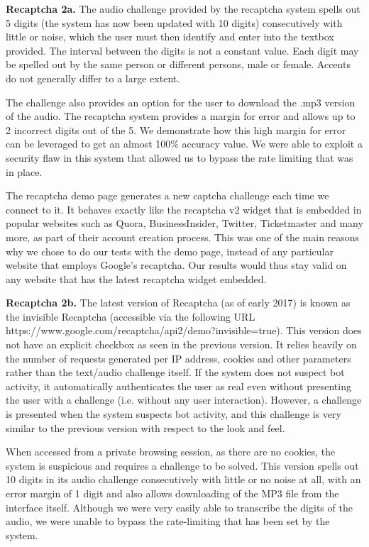 \textbf{Recaptcha 2a.}
The audio challenge provided by the recaptcha system spells out 5 digits (the system has now been updated with 
10 digits) consecutively with little or noise, which the user must then identify and enter into the textbox provided. 
The interval between the digits is not a constant value. Each digit may be spelled out by the same person or different 
persons, male or female. Accents do not generally differ to a large extent.

The challenge also provides an option for the user to download the .mp3 version of the audio. The recaptcha system provides 
a margin for error and allows up to 2 incorrect digits out of the 5. We demonstrate how this high margin for error can be 
leveraged to get an almost 100\% accuracy value. We were able to exploit a security flaw in this system that allowed us to 
bypass the rate limiting that was in place.

The recaptcha demo page generates a new captcha challenge each time we connect to it. It behaves exactly like the recaptcha 
v2 widget that is embedded in popular websites such as Quora, BusinessInsider, Twitter, Ticketmaster and many more, as part 
of their account creation process. This was one of the main reasons why we chose to do our tests with the demo page, instead 
of any particular website that employs Google's recaptcha. Our results would thus stay valid on any website that has the latest 
recaptcha widget embedded.

\textbf{Recaptcha 2b.} The latest version of Recaptcha (as of early 2017) is known as the invisible Recaptcha 
(accessible via the following URL https://www.google.com/recaptcha/api2/\newline demo?invisible=true). This 
version does not have an explicit checkbox as seen in the previous version. It relies heavily on the number 
of requests generated per IP address, cookies and other parameters rather than the text/audio challenge itself. 
If the system does not suspect bot activity, it automatically authenticates the user as real even without presenting 
the user with a challenge (i.e. without any user interaction). However, a challenge is presented when the system 
suspects bot activity, and this challenge is very similar to the previous version with respect to the look and feel.

When accessed from a private browsing session, as there are no cookies, the system is suspicious and requires a challenge 
to be solved. This version spells out 10 digits in its audio challenge consecutively with little or no noise at all, with 
an error margin of 1 digit and also allows downloading of the MP3 file from the interface itself. Although we were very 
easily able to transcribe the digits of the audio, we were unable to bypass the rate-limiting that has been set by the system.


